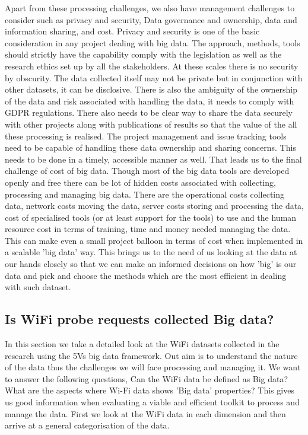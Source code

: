 Apart from these processing challenges, we also have management challenges to consider such as privacy and security, Data governance and ownership, data and information sharing, and cost.
Privacy and security is one of the basic consideration in any project dealing with big data.
The approach, methods, tools should strictly have the capability comply with the legislation as well as the research ethics set up by all the stakeholders.
At these scales there is no security by obscurity.
The data collected itself may not be private but in conjunction with other datasets, it can be disclosive.
There is also the ambiguity of the ownership of the data and risk associated with handling the data, it needs to comply with GDPR regulations.
There also needs to be clear way to share the data securely with other projects along with publications of results so that the value of the all these processing is realised.
The project management and issue tracking tools need to be capable of handling these data ownership and sharing concerns.
This needs to be done in a timely, accessible manner as well.
That leads us to the final challenge of cost of big data.
Though most of the big data tools are developed openly and free there can be lot of hidden costs associated with collecting, processing and managing big data.
There are the operational costs collecting data, network costs moving the data, server costs storing and processing the data, cost of specialised tools (or at least support for the tools) to use and the human resource cost in terms of training, time and money needed managing the data.
This can make even a small project balloon in terms of cost when implemented in a scalable 'big data' way.
This brings us to the need of us looking at the data at our hands closely so that we can make an informed decisions on how 'big' is our data and pick and choose the methods which are the most efficient in dealing with such dataset.


\subsection{Is WiFi probe requests collected Big data?}

In this section we take a detailed look at the WiFi datasets collected in the research using the 5Vs big data framework.
Out aim is to understand the nature of the data thus the challenges we will face processing and managing it.
We want to answer the following questions,
Can the WiFi data be defined as Big data?
What are the aspects where Wi-Fi data shows 'Big data' properties?
This gives us good information when evaluating a viable and efficient toolkit to process and manage the data.
First we look at the WiFi data in each dimension and then arrive at a general categorisation of the data.

